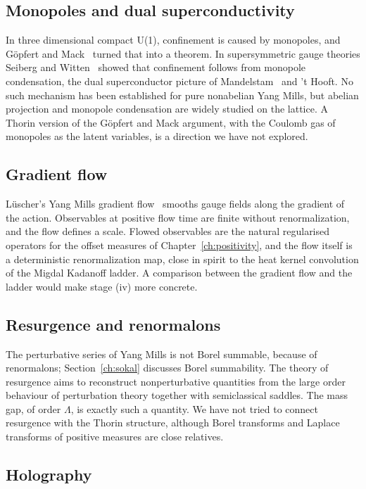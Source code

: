 \subsection{Monopoles and dual superconductivity}

In three dimensional compact U(1), confinement is caused by monopoles, and G\"opfert and Mack~\cite{GM82} turned that into a theorem. In supersymmetric gauge theories Seiberg and Witten~\cite{SW94} showed that confinement follows from monopole condensation, the dual superconductor picture of Mandelstam~\cite{Ma76} and 't Hooft. No such mechanism has been established for pure nonabelian Yang Mills, but abelian projection and monopole condensation are widely studied on the lattice. A Thorin version of the G\"opfert and Mack argument, with the Coulomb gas of monopoles as the latent variables, is a direction we have not explored.

\subsection{Gradient flow}

L\"uscher's Yang Mills gradient flow~\cite{Lu10} smooths gauge fields along the gradient of the action. Observables at positive flow time are finite without renormalization, and the flow defines a scale. Flowed observables are the natural regularised operators for the offset measures of Chapter~\ref{ch:positivity}, and the flow itself is a deterministic renormalization map, close in spirit to the heat kernel convolution of the Migdal Kadanoff ladder. A comparison between the gradient flow and the ladder would make stage (iv) more concrete.

\subsection{Resurgence and renormalons}

The perturbative series of Yang Mills is not Borel summable, because of renormalons; Section~\ref{ch:sokal} discusses Borel summability. The theory of resurgence aims to reconstruct nonperturbative quantities from the large order behaviour of perturbation theory together with semiclassical saddles. The mass gap, of order $\Lambda$, is exactly such a quantity. We have not tried to connect resurgence with the Thorin structure, although Borel transforms and Laplace transforms of positive measures are close relatives.

\subsection{Holography}

